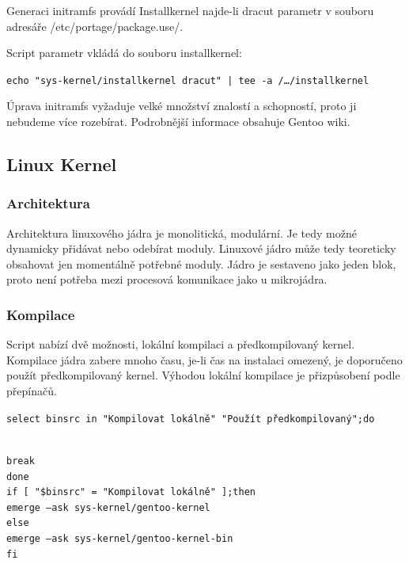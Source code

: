 \documentclass[12pt,a4paper,twoside,]{article}
\begin{document}
{Generaci initramfs provádí Installkernel najde-li dracut parametr v souboru adresáře /etc/portage/package.use/.

Script parametr vkládá do souboru installkernel:

\texttt{echo "sys-kernel/installkernel dracut" | tee -a /\dots/installkernel}

Úprava initramfs vyžaduje velké množství znalostí a schopností, proto ji nebudeme více rozebírat. Podrobnější informace obsahuje Gentoo wiki. %

\newpage
\subsection{\textsf{Linux Kernel}}

\subsubsection{\textsf{Architektura}}
Architektura linuxového jádra je monolitická, modulární. Je tedy možné dynamicky přidávat nebo odebírat moduly. Linuxové jádro může tedy teoreticky obsahovat jen momentálně potřebné moduly. Jádro je sestaveno jako jeden blok, proto není potřeba mezi procesová komunikace jako u mikrojádra. 
\subsubsection{\textsf{Kompilace}}
Script nabízí dvě možnosti, lokální kompilaci a předkompilovaný kernel. Kompilace jádra zabere mnoho času, je-li čas na instalaci omezený, je doporučeno použít předkompilovaný kernel. Výhodou lokální kompilace je přizpůsobení podle přepínačů. 

\hspace{-1.5em}\texttt{select binsrc in "Kompilovat lokálně" "Použít předkompilovaný";do}}\\
\hspace*{1.5em}\texttt{break}\\
\texttt{done}\\
\texttt{if [ "\$binsrc" = "Kompilovat lokálně" ];then}\\
\texttt{\hspace*{1.5em}emerge --ask sys-kernel/gentoo-kernel}\\
\texttt{else}\\
\texttt{\hspace*{1.5em}emerge --ask sys-kernel/gentoo-kernel-bin}\\
\texttt{fi}\\
\newpage
\end{document}
